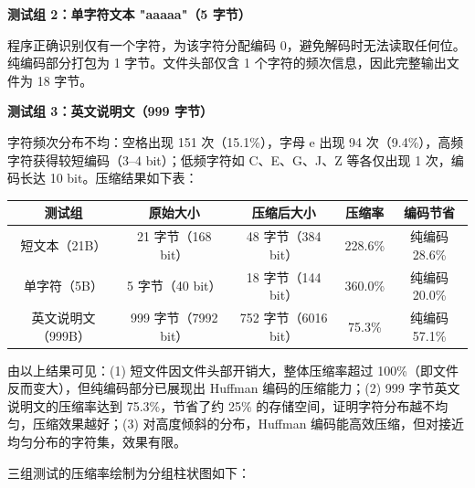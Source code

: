 \noindent\hspace*{2em}\textbf{测试组 2：单字符文本 "aaaaa"（5 字节）}\par
\noindent\hspace*{2em}程序正确识别仅有一个字符，为该字符分配编码 0，避免解码时无法读取任何位。纯编码部分打包为 1 字节。文件头部仅含 1 个字符的频次信息，因此完整输出文件为 18 字节。\par
\noindent\hspace*{2em}\textbf{测试组 3：英文说明文（999 字节）}\par
\noindent\hspace*{2em}字符频次分布不均：空格出现 151 次（15.1\%），字母 e 出现 94 次（9.4\%），高频字符获得较短编码（3--4 bit）；低频字符如 C、E、G、J、Z 等各仅出现 1 次，编码长达 10 bit。压缩结果如下表：\par
\begin{center}
\fontsize{9pt}{12pt}\selectfont
\renewcommand{\arraystretch}{1.3}
\begin{tabular}{|c|c|c|c|c|}
\hline
\textbf{测试组} & \textbf{原始大小} & \textbf{压缩后大小} & \textbf{压缩率} & \textbf{编码节省} \\ \hline
短文本（21B） & 21 字节（168 bit） & 48 字节（384 bit） & 228.6\% & 纯编码 28.6\% \\ \hline
单字符（5B） & 5 字节（40 bit） & 18 字节（144 bit） & 360.0\% & 纯编码 20.0\% \\ \hline
英文说明文（999B）& 999 字节（7992 bit）& 752 字节（6016 bit）& 75.3\% & 纯编码 57.1\% \\ \hline
\end{tabular}
\end{center}
\noindent\hspace*{2em}由以上结果可见：(1) 短文件因文件头部开销大，整体压缩率超过 100\%（即文件反而变大），但纯编码部分已展现出 Huffman 编码的压缩能力；(2) 999 字节英文说明文的压缩率达到 75.3\%，节省了约 25\% 的存储空间，证明字符分布越不均匀，压缩效果越好；(3) 对高度倾斜的分布，Huffman 编码能高效压缩，但对接近均匀分布的字符集，效果有限。\par
\noindent\hspace*{2em}三组测试的压缩率绘制为分组柱状图如下：\par
\begin{center}
\end{center}
